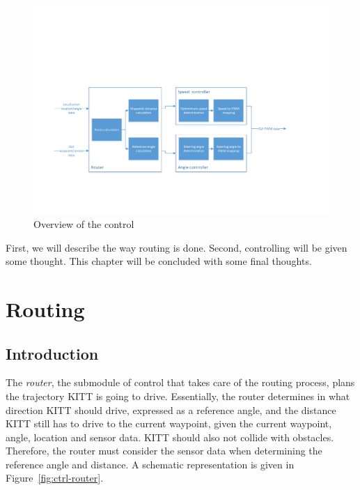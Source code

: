 \documentclass[11pt,titlepage]{report}
\begin{document}
\begin{figure}[H]
	\begin{center}
		\includegraphics[width=\linewidth]{resource/control-overview.pdf}
	\end{center}
	\caption{Overview of the control}
	\label{fig:ctrl-overview}
\end{figure}

First, we will describe the way routing is done. Second, controlling will be given some thought. This chapter will be concluded with some final thoughts.

\section{Routing}
\subsection{Introduction}
The \textit{router}, the submodule of control that takes care of the routing process, plans the trajectory KITT is going to drive. Essentially, the router determines in what direction KITT should drive, expressed as a reference angle, and the distance KITT still has to drive to the current waypoint, given the current waypoint, angle, location and sensor data. KITT should also not collide with obstacles. Therefore, the router must consider the sensor data when determining the reference angle and distance. A schematic representation is given in Figure~\ref{fig:ctrl-router}.
\end{document}
